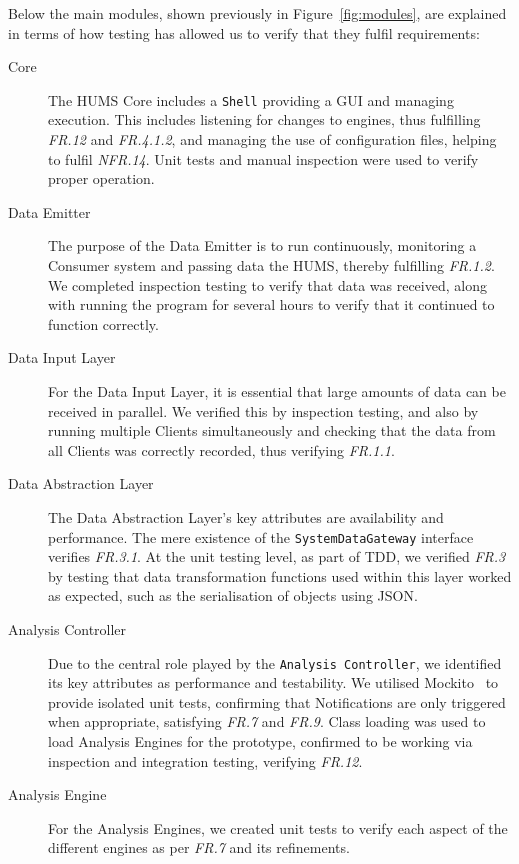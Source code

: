 \documentclass[10pt,a4paper]{article}
\begin{document}
Below the main modules, shown previously in Figure~\ref{fig:modules}, are explained in terms of how testing has allowed us to verify that they fulfil requirements:
\begin{description}
  \item[Core] The HUMS Core includes a \texttt{Shell} providing a GUI and managing execution. This includes listening for changes to engines, thus fulfilling \emph{FR.12} and \emph{FR.4.1.2}, and managing the use of configuration files, helping to fulfil \emph{NFR.14}. Unit tests and manual inspection were used to verify proper operation.

  \item[Data Emitter] The purpose of the Data Emitter is to run continuously, monitoring a Consumer system and passing data the HUMS, thereby fulfilling \emph{FR.1.2}. We completed inspection testing to verify that data was received, along with running the program for several hours to verify that it continued to function correctly.

  \item[Data Input Layer] For the Data Input Layer, it is essential that large amounts of data can be received in parallel. We verified this by inspection testing, and also by running multiple Clients simultaneously and checking that the data from all Clients was correctly recorded, thus verifying \emph{FR.1.1}.

  \item[Data Abstraction Layer] The Data Abstraction Layer's key attributes are availability and performance. The mere existence of the \texttt{SystemDataGateway} interface verifies \emph{FR.3.1}. At the unit testing level, as part of TDD, we verified \emph{FR.3} by testing that data transformation functions used within this layer worked as expected, such as the serialisation of objects using JSON.

  \item[Analysis Controller] Due to the central role played by the \texttt{Analysis Controller}, we identified its key attributes as performance and testability. We utilised Mockito~\cite{mockito} to provide isolated unit tests, confirming that Notifications are only triggered when appropriate, satisfying \emph{FR.7} and \emph{FR.9}. Class loading was used to load Analysis Engines for the prototype, confirmed to be working via inspection and integration testing, verifying \emph{FR.12}.

  \item[Analysis Engine] For the Analysis Engines, we created unit tests to verify each aspect of the different engines as per \emph{FR.7} and its refinements. 


\end{description}
\end{document}
